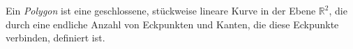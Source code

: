\begin{definition}
    Ein \emph{Polygon} ist eine geschlossene, stückweise lineare Kurve in der Ebene $\mathbb{R}^2$, die durch eine endliche Anzahl von Eckpunkten und Kanten, die diese Eckpunkte verbinden, definiert ist.
%
\end{definition}
